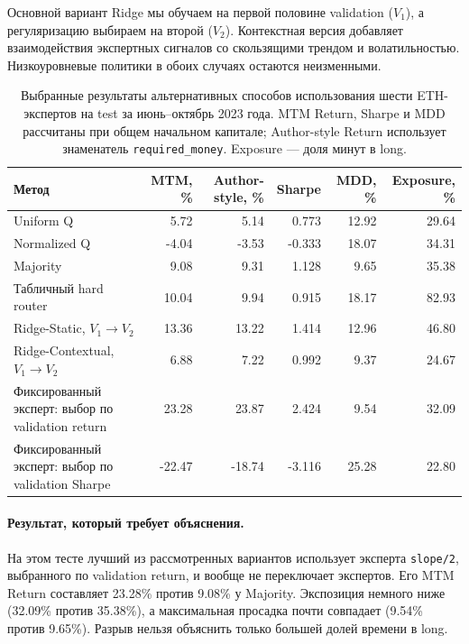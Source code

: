 \documentclass[9pt,a4paper,twocolumn]{extarticle}
\begin{document}
Основной вариант Ridge мы обучаем на первой половине validation ($V_1$), а регуляризацию
выбираем на второй ($V_2$). Контекстная версия добавляет взаимодействия экспертных сигналов со
скользящими трендом и волатильностью. Низкоуровневые политики в обоих случаях остаются
неизменными.

\begin{table}[t]
  \centering
  \caption{Выбранные результаты альтернативных способов использования шести ETH-экспертов
  на test за июнь--октябрь 2023 года. MTM Return, Sharpe и MDD рассчитаны при общем
  начальном капитале; Author-style Return использует знаменатель
  \texttt{required\_money}. Exposure --- доля минут в long.}
  \label{tab:aggregation_results}
  \footnotesize
  \renewcommand{\arraystretch}{1.15}
  \begin{tabularx}{\textwidth}{@{}Xrrrrr@{}}
    \toprule
    Метод
    & MTM, \%
    & Author-style, \%
    & Sharpe
    & MDD, \%
    & Exposure, \%\\
    \midrule
    Uniform Q
      & 5.72 & 5.14 & 0.773 & 12.92 & 29.64\\
    Normalized Q
      & -4.04 & -3.53 & -0.333 & 18.07 & 34.31\\
    Majority
      & 9.08 & 9.31 & 1.128 & 9.65 & 35.38\\
    Табличный hard router
      & 10.04 & 9.94 & 0.915 & 18.17 & 82.93\\
    Ridge-Static, $V_1\rightarrow V_2$
      & 13.36 & 13.22 & 1.414 & 12.96 & 46.80\\
    Ridge-Contextual, $V_1\rightarrow V_2$
      & 6.88 & 7.22 & 0.992 & 9.37 & 24.67\\
    Фиксированный эксперт:
    выбор по validation return
      & 23.28 & 23.87 & 2.424 & 9.54 & 32.09\\
    Фиксированный эксперт:
    выбор по validation Sharpe
      & -22.47 & -18.74 & -3.116 & 25.28 & 22.80\\
    \bottomrule
  \end{tabularx}
\end{table}

\paragraph{Результат, который требует объяснения.}

На этом тесте лучший из рассмотренных вариантов использует эксперта \texttt{slope/2},
выбранного по validation return, и вообще не переключает экспертов. Его MTM Return составляет
23.28\% против 9.08\% у Majority. Экспозиция немного ниже (32.09\% против 35.38\%), а
максимальная просадка почти совпадает (9.54\% против 9.65\%). Разрыв нельзя объяснить только
большей долей времени в long.
\end{document}
